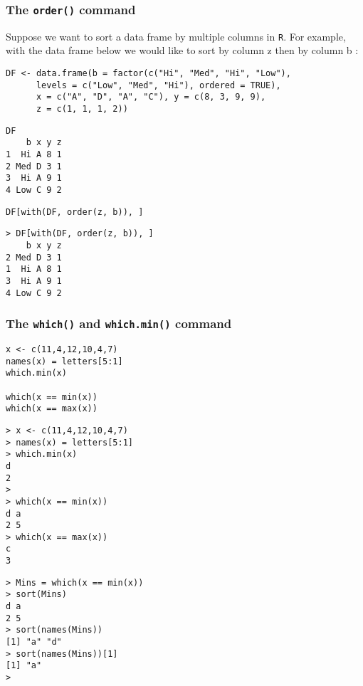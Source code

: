 \documentclass[]{article}
\begin{document}
\subsubsection{The \texttt{order()} command}
Suppose we want to sort a data frame by multiple columns in \texttt{R}. 
For example, with the data frame below we would like to sort by column z  then by column b :
\begin{framed}
\begin{verbatim}
DF <- data.frame(b = factor(c("Hi", "Med", "Hi", "Low"), 
      levels = c("Low", "Med", "Hi"), ordered = TRUE),
      x = c("A", "D", "A", "C"), y = c(8, 3, 9, 9),
      z = c(1, 1, 1, 2))
\end{verbatim} 
\end{framed}     
\begin{verbatim}
DF
    b x y z
1  Hi A 8 1
2 Med D 3 1
3  Hi A 9 1
4 Low C 9 2
\end{verbatim}
\begin{framed}
\begin{verbatim}
DF[with(DF, order(z, b)), ]
\end{verbatim}
\end{framed}
\begin{verbatim}
> DF[with(DF, order(z, b)), ]
    b x y z
2 Med D 3 1
1  Hi A 8 1
3  Hi A 9 1
4 Low C 9 2
\end{verbatim}


\subsubsection{The \texttt{which()} and \texttt{which.min()} command}

\begin{framed}
\begin{verbatim}
x <- c(11,4,12,10,4,7)
names(x) = letters[5:1]
which.min(x)

which(x == min(x))
which(x == max(x))
\end{verbatim}
\end{framed}

\begin{verbatim}
> x <- c(11,4,12,10,4,7)
> names(x) = letters[5:1]
> which.min(x)
d 
2 
> 
> which(x == min(x))
d a 
2 5 
> which(x == max(x))
c 
3 
\end{verbatim}

\begin{verbatim}
> Mins = which(x == min(x))
> sort(Mins)
d a 
2 5 
> sort(names(Mins))
[1] "a" "d"
> sort(names(Mins))[1]
[1] "a"
> 
\end{verbatim}
\end{document}
